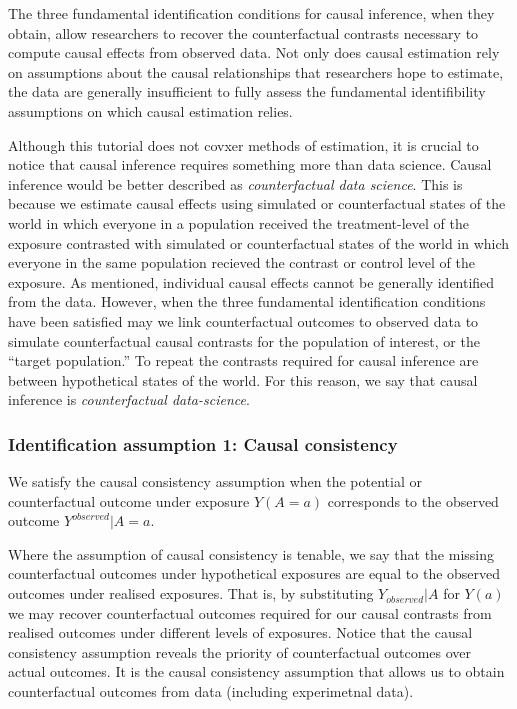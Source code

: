 \documentclass[
  singlecolumn]{report}
\begin{document}
The three fundamental identification conditions for causal inference,
when they obtain, allow researchers to recover the counterfactual
contrasts necessary to compute causal effects from observed data. Not
only does causal estimation rely on assumptions about the causal
relationships that researchers hope to estimate, the data are generally
insufficient to fully assess the fundamental identifibility assumptions
on which causal estimation relies.

Although this tutorial does not covxer methods of estimation, it is
crucial to notice that causal inference requires something more than
data science. Causal inference would be better described as
\emph{counterfactual data science}. This is because we estimate causal
effects using simulated or counterfactual states of the world in which
everyone in a population received the treatment-level of the exposure
contrasted with simulated or counterfactual states of the world in which
everyone in the same population recieved the contrast or control level
of the exposure. As mentioned, individual causal effects cannot be
generally identified from the data. However, when the three fundamental
identification conditions have been satisfied may we link counterfactual
outcomes to observed data to simulate counterfactual causal contrasts
for the population of interest, or the ``target population.'' To repeat
the contrasts required for causal inference are between hypothetical
states of the world. For this reason, we say that causal inference is
\emph{counterfactual data-science}.

\hypertarget{identification-assumption-1-causal-consistency}{%
\subsubsection{Identification assumption 1: Causal
consistency}\label{identification-assumption-1-causal-consistency}}

We satisfy the causal consistency assumption when the potential or
counterfactual outcome under exposure \(Y(A=a)\) corresponds to the
observed outcome \(Y^{observed}|A=a\).

Where the assumption of causal consistency is tenable, we say that the
missing counterfactual outcomes under hypothetical exposures are equal
to the observed outcomes under realised exposures. That is, by
substituting \(Y_{observed}|A\) for \(Y(a)\) we may recover
counterfactual outcomes required for our causal contrasts from realised
outcomes under different levels of exposures. Notice that the causal
consistency assumption reveals the priority of counterfactual outcomes
over actual outcomes. It is the causal consistency assumption that
allows us to obtain counterfactual outcomes from data (including
experimetnal data).
\end{document}
